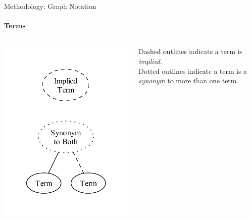 \documentclass{beamer}
\begin{document}
\begin{frame}[t]{Methodology: Graph Notation}
    \framesubtitle{Terms}
    \begin{columns}[T]
        \begin{column}{.5\textwidth}
            \vspace{-0.75cm}
            \centering
            \includegraphics[width=\linewidth]{assets/graphs/manual/catRels8.pdf}
        \end{column}
        \begin{column}{.5\textwidth}
            \vspace{0.75cm}
            Dashed outlines indicate a term is \emph{implied}.\\
            \vspace{2.5cm}
            Dotted outlines indicate a term is a \emph{synonym} to more than one term.
        \end{column}
    \end{columns}
\end{frame}
\end{document}
